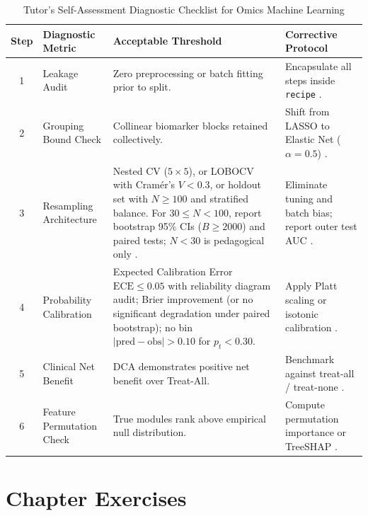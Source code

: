\documentclass[11pt,oneside]{book}
\begin{document}
\begin{table}[ht]
\centering
\caption{Tutor's Self-Assessment Diagnostic Checklist for Omics Machine Learning}
\label{tab:ml_checklist}
\small
\begin{tabularx}{\textwidth}{c p{4.0cm} p{4.6cm} X}
\toprule
\textbf{Step} & \textbf{Diagnostic Metric} & \textbf{Acceptable Threshold} & \textbf{Corrective Protocol} \\
\midrule
1 & Leakage Audit & Zero preprocessing or batch fitting prior to split. & Encapsulate all steps inside \texttt{recipe} \cite{kuhn2022tidymodels}. \\
2 & Grouping Bound Check & Collinear biomarker blocks retained collectively. & Shift from LASSO to Elastic Net ($\alpha=0.5$) \cite{zou2005regularization}. \\
3 & Resampling Architecture & Nested CV ($5 \times 5$), or LOBOCV with Cram\'er's $V < 0.3$, or holdout set with $N \ge 100$ and stratified balance. For $30 \le N < 100$, report bootstrap 95\% CIs ($B \ge 2000$) and paired tests; $N < 30$ is pedagogical only \cite{delong1988comparing, schenker2001judging}. & Eliminate tuning and batch bias; report outer test AUC \cite{kuhn2013applied}. \\
4 & Probability Calibration & Expected Calibration Error $\text{ECE} \le 0.05$ with reliability diagram audit; Brier improvement (or no significant degradation under paired bootstrap); no bin $|\text{pred}-\text{obs}| > 0.10$ for $p_t < 0.30$. & Apply Platt scaling or isotonic calibration \cite{platt1999probabilistic}. \\
5 & Clinical Net Benefit & DCA demonstrates positive net benefit over Treat-All. & Benchmark against treat-all / treat-none \cite{vickers2006decision}. \\
6 & Feature Permutation Check & True modules rank above empirical null distribution. & Compute permutation importance or TreeSHAP \cite{lundberg2020local}. \\
\bottomrule
\end{tabularx}
\end{table}

\section{Chapter Exercises}
\end{document}
